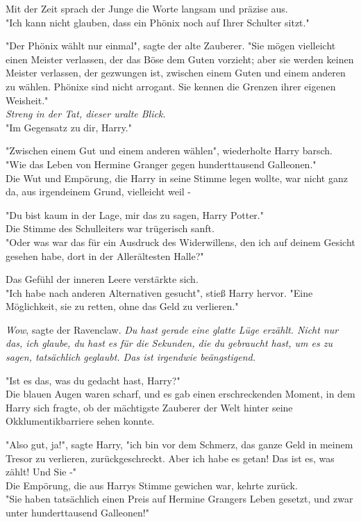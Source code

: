 {Mit der Zeit sprach der Junge die Worte langsam und präzise aus.\\ "Ich kann nicht glauben, dass ein Phönix noch auf Ihrer Schulter sitzt."

"Der Phönix wählt nur einmal", sagte der alte Zauberer. "Sie mögen vielleicht einen Meister verlassen, der das Böse dem Guten vorzieht; aber sie werden keinen Meister verlassen, der gezwungen ist, zwischen einem Guten und einem anderen zu wählen. Phönixe sind nicht arrogant. Sie kennen die Grenzen ihrer eigenen Weisheit."\\ \emph{Streng in der Tat, dieser uralte Blick.}\\ "Im Gegensatz zu dir, Harry."

"Zwischen einem Gut und einem anderen wählen", wiederholte Harry barsch. "Wie das Leben von Hermine Granger gegen hunderttausend Galleonen."\\ Die Wut und Empörung, die Harry in seine Stimme legen wollte, war nicht ganz da, aus irgendeinem Grund, vielleicht weil -

"Du bist kaum in der Lage, mir das zu sagen, Harry Potter."\\ Die Stimme des Schulleiters war trügerisch sanft.\\ "Oder was war das für ein Ausdruck des Widerwillens, den ich auf deinem Gesicht gesehen habe, dort in der Allerältesten Halle?"

Das Gefühl der inneren Leere verstärkte sich.\\ "Ich habe nach anderen Alternativen gesucht", stieß Harry hervor. "Eine Möglichkeit, sie zu retten, ohne das Geld zu verlieren."

\emph{Wow}, sagte der Ravenclaw. \emph{Du hast gerade eine glatte Lüge erzählt. Nicht nur das, ich glaube, du hast es für die Sekunden, die du gebraucht hast, um es zu sagen, tatsächlich geglaubt. Das ist irgendwie beängstigend.}

"Ist es das, was du gedacht hast, Harry?"\\ Die blauen Augen waren scharf, und es gab einen erschreckenden Moment, in dem Harry sich fragte, ob der mächtigste Zauberer der Welt hinter seine Okklumentikbarriere sehen konnte.

"Also gut, ja!", sagte Harry, "ich bin vor dem Schmerz, das ganze Geld in meinem Tresor zu verlieren, zurückgeschreckt. Aber ich habe es getan! Das ist es, was zählt! Und Sie -"\\ Die Empörung, die aus Harrys Stimme gewichen war, kehrte zurück.\\ "Sie haben tatsächlich einen Preis auf Hermine Grangers Leben gesetzt, und zwar unter hunderttausend Galleonen!"

}
